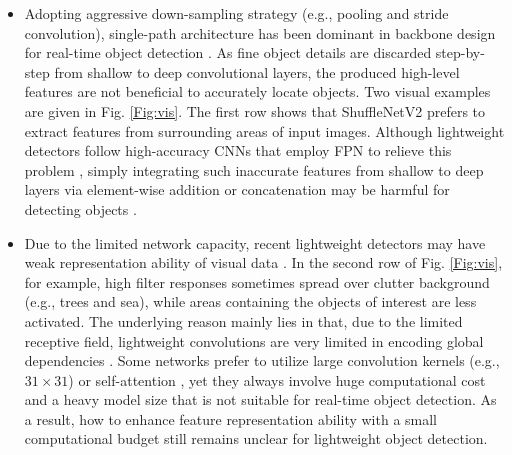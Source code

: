 \documentclass[lettersize,journal]{IEEEtran}
\begin{document}
\begin{itemize}
	\item Adopting aggressive down-sampling strategy (e.g., pooling and stride convolution), single-path architecture has been dominant in backbone design for real-time object detection \cite{sandler2018mobilenetv2,zhang2018shufflenet,wang2021scaled}. As fine object details are discarded step-by-step from shallow to deep convolutional layers, the produced high-level features are not beneficial to accurately locate objects. Two visual examples are given in Fig. \ref{Fig:vis}. The first row shows that ShuffleNetV2 \cite{ma2018shufflenet} prefers to extract features from surrounding areas of input images. Although lightweight detectors follow high-accuracy CNNs that employ FPN to relieve this problem \cite{li2018tiny}, simply integrating such inaccurate features from shallow to deep layers via element-wise addition or concatenation may be harmful for detecting objects \cite{li2020semantic}.
	\item Due to the limited network capacity, recent lightweight detectors may have weak representation ability of visual data \cite{mehta2021mobilevit}. In the second row of Fig. \ref{Fig:vis}, for example, high filter responses sometimes spread over clutter background (e.g., trees and sea), while areas containing the objects of interest are less activated. The underlying reason mainly lies in that, due to the limited receptive field, lightweight convolutions are very limited in encoding global dependencies \cite{mehta2021mobilevit}. Some networks prefer to utilize large convolution kernels (e.g., $31 \times 31$) \cite{peng2017large,ding2022scaling} or self-attention \cite{wang2018non}, yet they always involve huge computational cost and a heavy model size that is not suitable for real-time object detection. As a result, how to enhance feature representation ability with a small computational budget still remains unclear for lightweight object detection.
\end{itemize}
\end{document}
